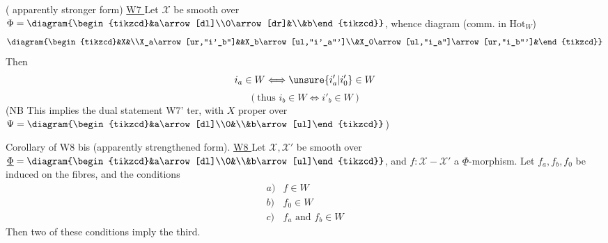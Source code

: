  ( apparently stronger form)
\uline{W7 } Let $\mathcal X$ be smooth over $\Phi=\diagram{\begin{tikzcd}&a\arrow[dl]\\0\arrow[dr]&\\&b\end{tikzcd}}$, whence diagram (comm. in $\mathrm{Hot}_W$)
\[\diagram{\begin{tikzcd}&X&\\X_a\arrow[ur,"i'_b"]&&X_b\arrow[ul,"i'_a"']\\&X_0\arrow[ul,"i_a"]\arrow[ur,"i_b"']&\end{tikzcd}}\]
Then
\[i_a\in W\Longleftrightarrow\unsure{i'_a|i'_0}\in W\]
\[(\text{thus }i_b\in W\Longleftrightarrow i'_b\in W)\]
(NB This implies the dual statement W7' ter, with $X$ proper over $\Psi=\diagram{\begin{tikzcd}&a\arrow[dl]\\0&\\&b\arrow[ul]\end{tikzcd}}$)

Corollary of W8 bis (apparently strengthened form).
\uline{W8 } Let $\mathcal X,\mathcal X'$ be smooth over $\underline\Phi=\diagram{\begin{tikzcd}&a\arrow[dl]\\0&\\&b\arrow[ul]\end{tikzcd}}$, and $f:\mathcal X-\mathcal X'$ a $\underline\Phi$-morphism. Let $f_a,f_b,f_0$ be induced on the fibres, and the conditions
\[\begin{array}{ll}a)&f\in W\\b)&f_0\in W\\c)&f_a\text{ and }f_b\in W\end{array}\]
Then two of these conditions imply the third.
